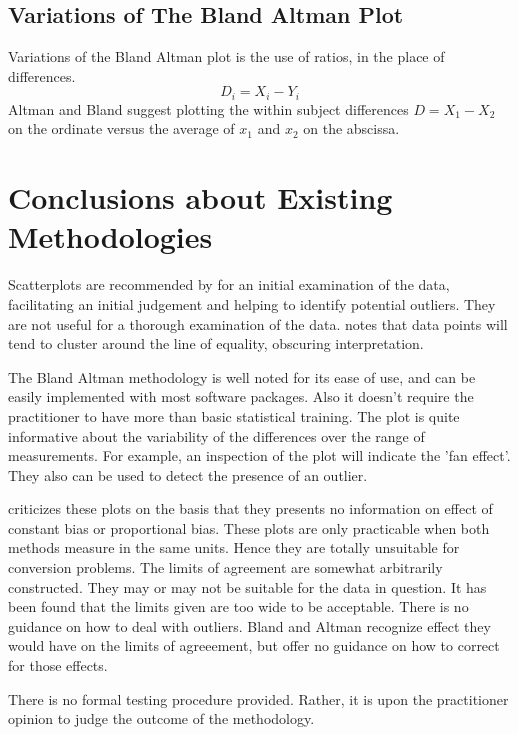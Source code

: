 \documentclass[Main.tex]{subfiles}
\begin{document}
	

	\subsection{Variations of The Bland Altman Plot}

	Variations of the Bland Altman plot is the use of ratios, in the
	place of differences.
	\begin{equation}
	D_{i} = X_{i} - Y_{i}   \label{BA01}
	\end{equation}
	Altman and Bland suggest plotting the within subject differences $
	D = X_{1} - X_{2} $ on the ordinate versus the average of $x_{1}$
	and  $x_{2}$ on the abscissa.
	

	
\section{Conclusions about Existing Methodologies}

Scatterplots are recommended by \citet{BA83} for an initial
examination of the data, facilitating an initial judgement and helping to identify potential outliers. They are not useful for a thorough examination of the data. \citet{BritHypSoc} notes that data points will tend to cluster around the line of equality, obscuring interpretation.


The Bland Altman methodology is well noted for its ease of use, and can be easily implemented with most software packages. Also it
doesn't require the practitioner to have more than basic statistical training. The plot is quite informative about the variability of the differences over the range of measurements. For example, an inspection of the plot will indicate the 'fan effect'. They also can be used to detect the presence of an outlier.

\citet{ludbrook97,ludbrook02} criticizes these plots on the
basis that they presents no information on effect of constant bias
or proportional bias. These plots are only practicable when both methods measure in the same units. Hence they are totally
unsuitable for conversion problems. The limits of agreement are somewhat arbitrarily constructed. They may or may not be suitable
for the data in question. It has been found that the limits given are too wide to be acceptable. There is no guidance on how to deal
with outliers. Bland and Altman recognize effect they would have on the limits of agreeement, but offer no guidance on how to correct for those effects.

There is no formal testing procedure provided. Rather, it is upon
the practitioner opinion to judge the outcome of the methodology.





\end{document}
